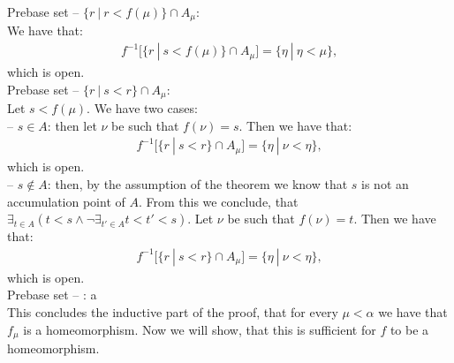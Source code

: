 Prebase set -- $\{r\ |\ r<f(\mu)\} \cap A_\mu$: \\
We have that:
\begin{align*}
f^{-1}[\{r\ |\ s<f(\mu)\} \cap A_\mu] = \{\eta\ |\ \eta <\mu\},
\end{align*}
which is open. \\
Prebase set -- $\{r\ |\ s<r\} \cap A_\mu$: \\
Let $s < f(\mu)$. We have two cases: \\
-- $s \in A$: then let $\nu$ be such that $f(\nu)=s$. Then we have that:
\begin{align*}
f^{-1}[\{r\ |\ s<r\} \cap A_\mu] = \{\eta\ |\ \nu < \eta \},
\end{align*}
which is open. \\
-- $s \not\in A$: then, by the assumption of the theorem we know that $s$ is not an accumulation 
point of $A$. From this we conclude, that 
$\exists_{t\in A} (t<s \land \neg \exists_{t' \in A} t<t'<s)$. Let $\nu$ be such that $f(\nu) = t$. 
Then we have that:
\begin{align*}
f^{-1}[\{r\ |\ s<r\} \cap A_\mu] = \{\eta\ |\ \nu < \eta \},
\end{align*}
which is open. \\
Prebase set -- :
a\\
This concludes the inductive part of the proof, that for every $\mu < \alpha$ we have that 
$f_\mu$ is a homeomorphism. Now we will show, that this is sufficient for $f$ to be a 
homeomorphism. \\
